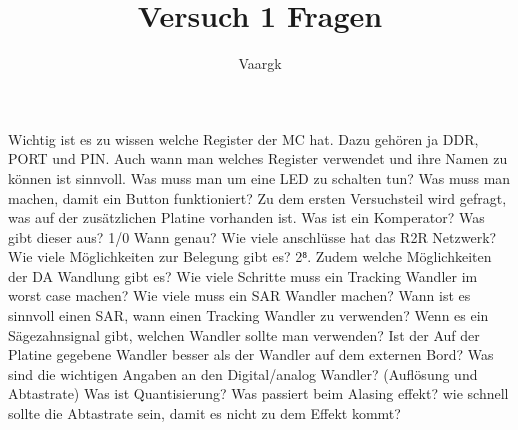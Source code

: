 \documentclass[12pt]{article}
\title{Versuch 1 Fragen}
\author{
        Vaargk
}
\begin{document}
\maketitle
Wichtig ist es zu wissen welche Register der MC hat. Dazu gehören ja DDR, PORT und PIN. Auch wann man welches Register verwendet und ihre Namen zu können ist sinnvoll. Was muss man um eine LED zu schalten tun? Was muss man machen, damit ein Button funktioniert?
Zu dem ersten Versuchsteil wird gefragt, was auf der zusätzlichen Platine vorhanden ist. Was ist ein Komperator? Was gibt dieser aus? 1/0 Wann genau? Wie viele anschlüsse hat das R2R Netzwerk? Wie viele Möglichkeiten zur Belegung gibt es? 2⁸. Zudem welche Möglichkeiten der DA Wandlung gibt es? Wie viele Schritte muss ein Tracking Wandler im worst case machen? Wie viele muss ein SAR Wandler machen? Wann ist es sinnvoll einen SAR, wann einen Tracking Wandler zu verwenden? Wenn es ein Sägezahnsignal gibt, welchen Wandler sollte man verwenden? Ist der Auf der Platine gegebene Wandler besser als der Wandler auf dem externen Bord? Was sind die wichtigen Angaben an den Digital/analog Wandler? (Auflösung und Abtastrate) Was ist Quantisierung? Was passiert beim Alasing effekt? wie schnell sollte die Abtastrate sein, damit es nicht zu dem Effekt kommt?
\end{document}
